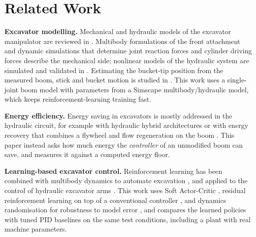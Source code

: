 \section{Related Work}
\label{sec:related}

\textbf{Excavator modelling.} Mechanical and hydraulic models of the excavator manipulator are
reviewed in \cite{xu_review_2016}. Multibody formulations of the front attachment
\cite{noauthor_dynamical_2017} and dynamic simulations that determine joint reaction forces and
cylinder driving forces \cite{dang_tan_dynamic_2020} describe the mechanical side; nonlinear
models of the hydraulic system are simulated and validated in \cite{casoli_simulation_2015}.
Estimating the bucket-tip position from the measured boom, stick and bucket motion is studied in
\cite{sun_analysis_2020}. This work uses a single-joint boom model with parameters from a
Simscape multibody/hydraulic model, which keeps reinforcement-learning training fast.

\textbf{Energy efficiency.} Energy saving in excavators is mostly addressed in the hydraulic
circuit, for example with hydraulic hybrid architectures \cite{casoli_hydraulic_2016} or with
energy recovery that combines a flywheel and flow regeneration on the boom
\cite{li_novel_2020}. This paper instead asks how much energy the \emph{controller} of an
unmodified boom can save, and measures it against a computed energy floor.

\textbf{Learning-based excavator control.} Reinforcement learning has been combined with
multibody dynamics to automate excavation \cite{kurinov2020excavator}, and applied to the
control of hydraulic excavator arms \cite{egli2022excavator}. This work uses Soft Actor-Critic
\cite{haarnoja2018sac}, residual reinforcement learning on top of a conventional controller
\cite{johannink2019residual}, and dynamics randomisation for robustness to model error
\cite{peng2018dr}, and compares the learned policies with tuned PID baselines on the same test
conditions, including a plant with real machine parameters.
